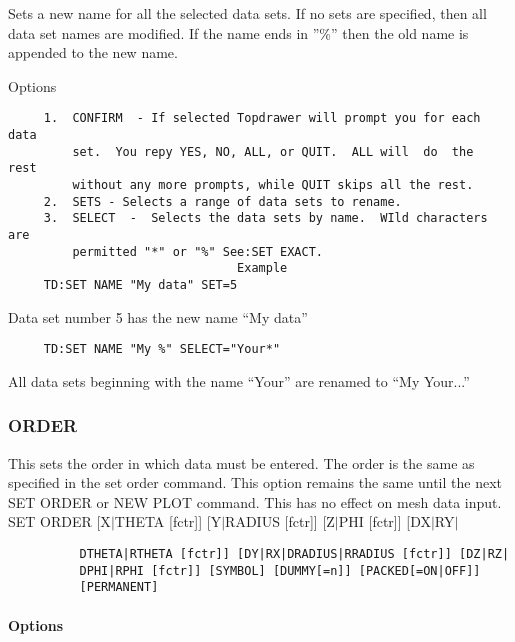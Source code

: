 Sets  a  new  name  for  all  the  selected  data sets.  If no sets are
specified, then all data set names are modified.  If the name  ends  in
''\%'' then the old name is appended to the new name.  

Options 
\begin{verbatim}
     1.  CONFIRM  - If selected Topdrawer will prompt you for each data
         set.  You repy YES, NO, ALL, or QUIT.  ALL will  do  the  rest
         without any more prompts, while QUIT skips all the rest.  
     2.  SETS - Selects a range of data sets to rename.  
     3.  SELECT  -  Selects the data sets by name.  WIld characters are
         permitted "*" or "%" See:SET EXACT.  
                                Example
     TD:SET NAME "My data" SET=5 
\end{verbatim}
Data set number 5 has the new name ``My data'' 
\begin{verbatim}
     TD:SET NAME "My %" SELECT="Your*" 
\end{verbatim}
All   data   sets  beginning  with  the  name  ``Your''  are  renamed  to
``My Your...'' 
\subsubsection{ORDER}
This  sets  the  order in which data must be entered.  The order is the
same as specified in the set order command.  This  option  remains  the
same  until the next SET ORDER or NEW PLOT command.  This has no effect
on mesh data input.  
SET ORDER [X$|$THETA [fctr]] [Y$|$RADIUS [fctr]] [Z$|$PHI [fctr]] [DX$|$RY$|$
\begin{verbatim}
          DTHETA|RTHETA [fctr]] [DY|RX|DRADIUS|RRADIUS [fctr]] [DZ|RZ|
          DPHI|RPHI [fctr]] [SYMBOL] [DUMMY[=n]] [PACKED[=ON|OFF]]
          [PERMANENT] 
\end{verbatim}
\paragraph{Options}

